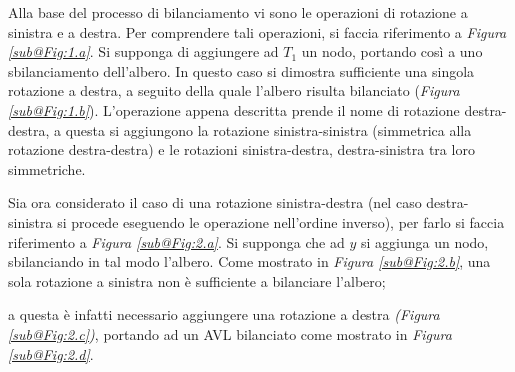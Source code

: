 \documentclass{subfiles}
\begin{document}
Alla base del processo di bilanciamento vi sono le operazioni di rotazione a sinistra e a destra.
Per comprendere tali operazioni, si faccia riferimento a \emph{Figura \ref{sub@Fig:1.a}}.
Si supponga di aggiungere ad \(T_{1}\) un nodo, portando così a uno sbilanciamento dell'albero.
In questo caso si dimostra sufficiente una singola rotazione a destra, a seguito della quale l'albero risulta bilanciato (\emph{Figura \ref{sub@Fig:1.b}}).
L'operazione appena descritta prende il nome di rotazione destra-destra,
a questa si aggiungono la rotazione sinistra-sinistra (simmetrica alla rotazione destra-destra) e le rotazioni sinistra-destra, destra-sinistra tra loro simmetriche.



Sia ora considerato il caso di una rotazione sinistra-destra (nel caso destra-sinistra si procede eseguendo le operazione nell'ordine inverso),
per farlo si faccia riferimento a \emph{Figura \ref{sub@Fig:2.a}}.
Si supponga che ad \(y\) si aggiunga un nodo, sbilanciando in tal modo l'albero.
Come mostrato in \emph{Figura \ref{sub@Fig:2.b}}, una sola rotazione a sinistra non è sufficiente a bilanciare l'albero;

a questa è infatti necessario aggiungere una rotazione a destra \emph{(Figura \ref{sub@Fig:2.c})},
portando ad un AVL bilanciato come mostrato in \emph{Figura \ref{sub@Fig:2.d}}.
\end{document}

